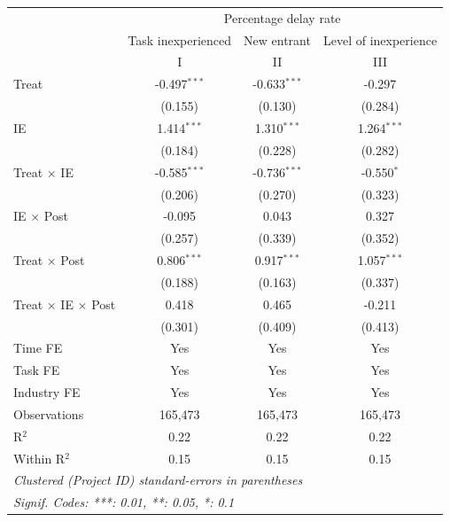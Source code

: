 \documentclass[
]{article}
\begin{document}
\begin{tabular}{lccc}
   \toprule
    & \multicolumn{3}{c}{Percentage delay rate}\\
                                     & Task inexperienced & New entrant    & Level of inexperience \\   
                                     & I                  & II             & III\\  
   Treat                             & -0.497$^{***}$     & -0.633$^{***}$ & -0.297\\   
                                     & (0.155)            & (0.130)        & (0.284)\\   
   IE                                & 1.414$^{***}$      & 1.310$^{***}$  & 1.264$^{***}$\\   
                                     & (0.184)            & (0.228)        & (0.282)\\   
   Treat $\times$ IE                 & -0.585$^{***}$     & -0.736$^{***}$ & -0.550$^{*}$\\   
                                     & (0.206)            & (0.270)        & (0.323)\\   
   IE $\times$ Post                  & -0.095             & 0.043          & 0.327\\   
                                     & (0.257)            & (0.339)        & (0.352)\\   
   Treat $\times$ Post               & 0.806$^{***}$      & 0.917$^{***}$  & 1.057$^{***}$\\   
                                     & (0.188)            & (0.163)        & (0.337)\\   
   Treat $\times$ IE $\times$ Post   & 0.418              & 0.465          & -0.211\\   
                                     & (0.301)            & (0.409)        & (0.413)\\   
   Time FE                           & Yes                & Yes            & Yes\\  
   Task FE                           & Yes                & Yes            & Yes\\  
   Industry FE                       & Yes                & Yes            & Yes\\  
   Observations                      & 165,473            & 165,473        & 165,473\\  
   R$^2$                             & 0.22               & 0.22           & 0.22\\  
   Within R$^2$                      & 0.15               & 0.15           & 0.15\\  
   \midrule
   \multicolumn{4}{l}{\emph{Clustered (Project ID) standard-errors in parentheses}}\\
   \multicolumn{4}{l}{\emph{Signif. Codes: ***: 0.01, **: 0.05, *: 0.1}}\\
\end{tabular}
\par\endgroup
\end{document}
